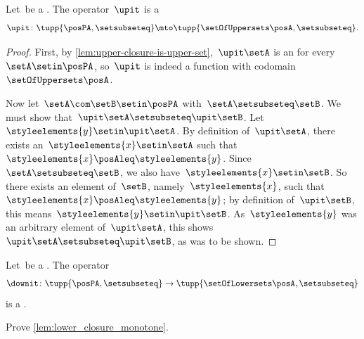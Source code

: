 \begin{lemma}
    Let~\posA be a .
    The  operator~$\upit$ is a 
    \begin{equation}
\upit \colon \tupp{\posPA, \setsubseteq} \mto \tupp{\setOfUppersets \posA,{{\setsubseteq}}}.
\end{equation}
\end{lemma}
\begin{proof}
    First, by \cref{lem:upper-closure-is-upper-set},~$\upit \setA$ is an  for every~$\setA \setin \posPA$, so~$\upit$ is indeed a function with codomain~$\setOfUppersets \posA$.

    Now let~$\setA\com \setB \setin \linebreak[1] \posPA$ with~$\setA\setsubseteq \setB$.
    We must show that~$\upit \setA \setsubseteq \upit \setB$.
    Let~$\styleelements{y}\setin \upit \setA$.
    By definition of~$\upit \setA$, there exists an~$\styleelements{x}\setin \setA$ such that~$\styleelements{x}\posAleq \styleelements{y}$.
    Since~$\setA\setsubseteq \setB$, we also have~$\styleelements{x}\setin \setB$.
    So there exists an element of~$\setB$, namely~$\styleelements{x}$, such that~$\styleelements{x}\posAleq \styleelements{y}$; by definition of~$\upit \setB$, this means~$\styleelements{y}\setin \upit \setB$.
    As~$\styleelements{y}$ was an arbitrary element of~$\upit \setA$, this shows~$\upit \setA \setsubseteq \upit \setB$, as was to be shown.
\end{proof}

\begin{lemma}
    \label{lem:lower_closure_monotone}
    Let~\posA be a .
    The  operator~
    \begin{equation}
    \downit \colon \tupp{\posPA, \setsubseteq}  \to \tupp{\setOfLowersets \posA, \setsubseteq}
\end{equation}
is a .
\end{lemma}


\begin{gradedexercise} 
    Prove \cref{lem:lower_closure_monotone}.
\end{gradedexercise}


